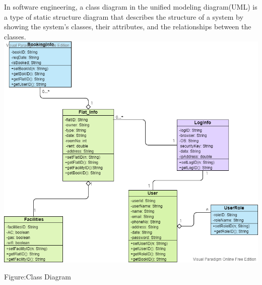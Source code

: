 \documentclass[10pt]{article}
\begin{document}
 In software engineering, a class diagram in the unified modeling diagram(UML) is a type of static structure diagram that describes the structure of a system by showing the system's classes, their attributes, and the relationships between the classes.
 \vskip18pt%
 \newline
\includegraphics[width=1\textwidth, inner]{Class Diagram Example_ Company Structure (1).png}\\
\begin{center}
 Figure:Class Diagram
\end{center}
 
\newpage
\end{document}
